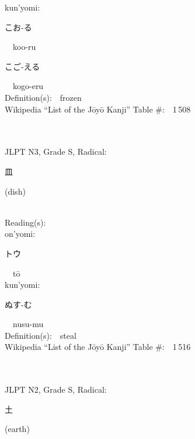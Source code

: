 \begin{multicols}{2}
{\hspace*{1em}}kun'yomi:\ \ \\
{\hspace*{2em}}{\begin{CJK}{UTF8}{min} こお-る \end{CJK}}\ \ koo-ru\ \ \\
{\hspace*{2em}}{\begin{CJK}{UTF8}{min} こご-える \end{CJK}}\ \ kogo-eru\ \ \\
Definition(s):\ \ frozen \\
Wikipedia ``List of the J\=oy\=o Kanji'' Table \#:\ \ 1\,508 \\
\ \ \\
{\fontsize{34pt}{40pt}  }\ \ \\  %
{JLPT N3, Grade S, Radical:\ \ {\begin{CJK}{UTF8}{min} 皿 \end{CJK}} (dish) } \\
Reading(s):\ \ \\
{\hspace*{1em}}on'yomi:\ \ \\
{\hspace*{2em}}{\begin{CJK}{UTF8}{min} トウ \end{CJK}}\ \ t\=o\ \ \\
{\hspace*{1em}}kun'yomi:\ \ \\
{\hspace*{2em}}{\begin{CJK}{UTF8}{min} ぬす-む \end{CJK}}\ \ nusu-mu\ \ \\
Definition(s):\ \ steal \\
Wikipedia ``List of the J\=oy\=o Kanji'' Table \#:\ \ 1\,516 \\
\ \ \\
{\fontsize{34pt}{40pt}  }\ \ \\  %
{JLPT N2, Grade S, Radical:\ \ {\begin{CJK}{UTF8}{min} 土 \end{CJK}} (earth) } \\

\end{multicols}

